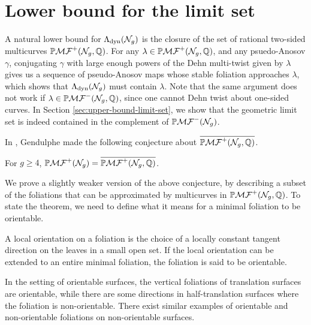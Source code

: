 \section{Lower bound for the limit set}
\label{sec:lower-bound-limit-set}

A natural lower bound for $\Lambda_{\mathrm{dyn}}(\mathcal{N}_g)$ is the closure of the set of rational two-sided multicurves $\mathbb{P}\mathcal{MF}^+(\mathcal{N}_g, \mathbb{Q})$.
For any $\lambda \in \mathbb{P}\mathcal{MF}^+(\mathcal{N}_g, \mathbb{Q})$, and any psuedo-Anosov $\gamma$, conjugating $\gamma$ with large enough powers of the Dehn multi-twist given by $\lambda$ gives us a sequence of pseudo-Anosov maps whose stable foliation approaches $\lambda$, which shows that $\Lambda_{\mathrm{dyn}}(\mathcal{N}_g)$ must contain $\lambda$.
Note that the same argument does not work if $\lambda \in \mathbb{P}\mathcal{MF}^-(\mathcal{N}_g, \mathbb{Q})$, since one cannot Dehn twist about one-sided curves.
In Section \ref{sec:upper-bound-limit-set}, we show that the geometric limit set is indeed contained in the complement of $\mathbb{P}\mathcal{MF}^-(\mathcal{N}_g)$.

In \cite{gendulphe_whats_2017}, Gendulphe made the following conjecture about $\overline{\mathbb{P}\mathcal{MF}^+(\mathcal{N}_g, \mathbb{Q})}$.
\begin{conjecture}
  \label{conj:gendulphe-1}
  For $g \geq 4$, $\mathbb{P}\mathcal{MF}^+(\mathcal{N}_g) = \overline{\mathbb{P}\mathcal{MF}^+(\mathcal{N}_g, \mathbb{Q})}$.
\end{conjecture}
We prove a slightly weaker version of the above conjecture, by describing a subset of the foliations that can be approximated by multicurves in $\mathbb{P}\mathcal{MF}^+(\mathcal{N}_g, \mathbb{Q})$.
To state the theorem, we need to define what it means for a minimal foliation to be orientable.
\begin{definition}
  A local orientation on a foliation is the choice of a locally constant tangent direction on the leaves in a small open set.
  If the local orientation can be extended to an entire minimal foliation, the foliation is said to be orientable.
\end{definition}
In the setting of orientable surfaces, the vertical foliations of translation surfaces are orientable, while there are some directions in half-translation surfaces where the foliation is non-orientable.
There exist similar examples of orientable and non-orientable foliations on non-orientable surfaces.


